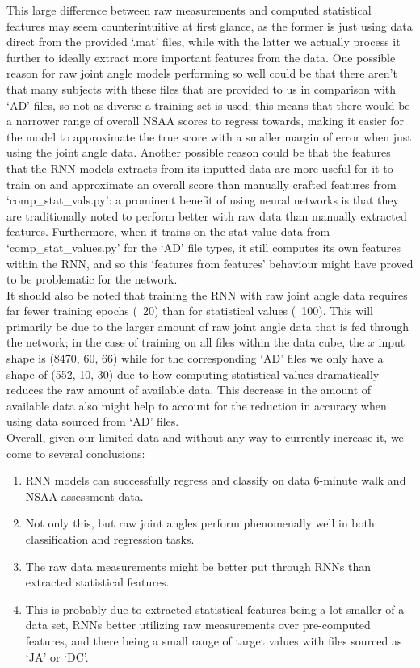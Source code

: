\documentclass[12pt,twoside]{report}
\begin{document}
\quad This large difference between raw measurements and computed statistical features may seem counterintuitive at first glance, as the former is just using data direct from the provided ‘.mat’ files, while with the latter we actually process it further to ideally extract more important features from the data. One possible reason for raw joint angle models performing so well could be that there aren’t that many subjects with these files that are provided to us in comparison with ‘AD’ files, so not as diverse a training set is used; this means that there would be a narrower range of overall NSAA scores to regress towards, making it easier for the model to approximate the true score with a smaller margin of error when just using the joint angle data. Another possible reason could be that the features that the RNN models extracts from its inputted data are more useful for it to train on and approximate an overall score than manually crafted features from ‘comp\_stat\_vals.py’: a prominent benefit of using neural networks is that they are traditionally noted to perform better with raw data than manually extracted features. Furthermore, when it trains on the stat value data from ‘comp\_stat\_values.py’ for the ‘AD’ file types, it still computes its own features within the RNN, and so this ‘features from features’ behaviour might have proved to be problematic for the network.\\

\quad It should also be noted that training the RNN with raw joint angle data requires far fewer training epochs (~20) than for statistical values (~100). This will primarily be due to the larger amount of raw joint angle data that is fed through the network; in the case of training on all files within the data cube, the $x$ input shape is (8470, 60, 66) while for the corresponding ‘AD’ files we only have a shape of (552, 10, 30) due to how computing statistical values dramatically reduces the raw amount of available data. This decrease in the amount of available data also might help to account for the reduction in accuracy when using data sourced from ‘AD’ files.\\

\quad Overall, given our limited data and without any way to currently increase it, we come to several conclusions:

\begin{enumerate}
	\item RNN models can successfully regress and classify on data 6-minute walk and NSAA assessment data.
	\item Not only this, but raw joint angles perform phenomenally well in both classification and regression tasks.
	\item The raw data measurements might be better put through RNNs than extracted statistical features.
	\item This is probably due to extracted statistical features being a lot smaller of a data set, RNNs better utilizing raw measurements over pre-computed features, and there being a small range of target values with files sourced as ‘JA’ or ‘DC’.
\end{enumerate}
\end{document}
